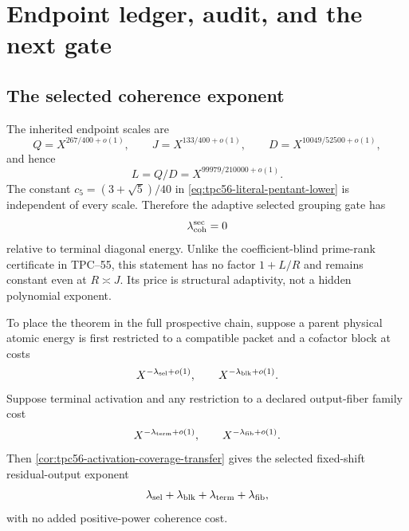 \section{Endpoint ledger, audit, and the next gate}
\label{sec:endpoint-claims}

\subsection{The selected coherence exponent}

The inherited endpoint scales are
\begin{equation}
 Q=X^{267/400+o(1)},
 \qquad
 J=X^{133/400+o(1)},
 \qquad
 D=X^{10049/52500+o(1)},
 \label{eq:tpc56-endpoint-QJD}
\end{equation}
and hence
\begin{equation}
 L=Q/D=X^{99979/210000+o(1)}.
 \label{eq:tpc56-endpoint-L}
\end{equation}
The constant \(c_5=(3+\sqrt5)/40\) in
\eqref{eq:tpc56-literal-pentant-lower} is independent of every scale.
Therefore the adaptive selected grouping gate has
\begin{equation}
 \lambda_{\rm coh}^{\rm sec}=0
 \label{eq:tpc56-zero-sector-exponent}
\end{equation}
relative to terminal diagonal energy.  Unlike the coefficient-blind
prime-rank certificate in TPC--55, this statement has no factor
\(1+L/R\) and remains constant even at \(R\asymp J\).  Its price is
structural adaptivity, not a hidden polynomial exponent.

To place the theorem in the full prospective chain, suppose a parent
physical atomic energy is first restricted to a compatible packet and a
cofactor block at costs
\begin{equation}
 X^{-\lambda_{\rm sel}+o(1)},
 \qquad
 X^{-\lambda_{\rm blk}+o(1)}.
 \label{eq:tpc56-upstream-selection-losses}
\end{equation}
Suppose terminal activation and any restriction to a declared output-fiber
family cost
\begin{equation}
 X^{-\lambda_{\rm term}+o(1)},
 \qquad
 X^{-\lambda_{\rm fib}+o(1)}.
 \label{eq:tpc56-activation-coverage-losses}
\end{equation}
Then \cref{cor:tpc56-activation-coverage-transfer} gives the selected
fixed-shift residual-output exponent
\begin{equation}
 \lambda_{\rm sel}+\lambda_{\rm blk}
 +\lambda_{\rm term}+\lambda_{\rm fib},
 \label{eq:tpc56-selected-ledger}
\end{equation}
with no added positive-power coherence cost.

